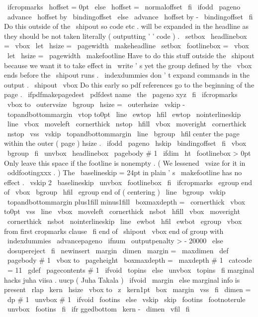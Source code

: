 {
%
\
ifcropmarks
\
hoffset
=
0pt
\
else
\
hoffset
=
\
normaloffset
\
fi
%
\
ifodd
\
pageno
\
advance
\
hoffset
by
\
bindingoffset
\
else
\
advance
\
hoffset
by
-
\
bindingoffset
\
fi
%
%
Do
this
outside
of
the
\
shipout
so
code
etc
.
will
be
expanded
in
%
the
headline
as
they
should
be
not
taken
literally
(
outputting
'
'
code
)
.
\
setbox
\
headlinebox
=
\
vbox
{
\
let
\
hsize
=
\
pagewidth
\
makeheadline
}
%
\
setbox
\
footlinebox
=
\
vbox
{
\
let
\
hsize
=
\
pagewidth
\
makefootline
}
%
%
{
%
%
Have
to
do
this
stuff
outside
the
\
shipout
because
we
want
it
to
%
take
effect
in
\
write
'
s
yet
the
group
defined
by
the
\
vbox
ends
%
before
the
\
shipout
runs
.
%
\
indexdummies
%
don
'
t
expand
commands
in
the
output
.
\
shipout
\
vbox
{
%
%
Do
this
early
so
pdf
references
go
to
the
beginning
of
the
page
.
\
ifpdfmakepagedest
\
pdfdest
name
{
\
the
\
pageno
}
xyz
\
fi
%
\
ifcropmarks
\
vbox
to
\
outervsize
\
bgroup
\
hsize
=
\
outerhsize
\
vskip
-
\
topandbottommargin
\
vtop
to0pt
{
%
\
line
{
\
ewtop
\
hfil
\
ewtop
}
%
\
nointerlineskip
\
line
{
%
\
vbox
{
\
moveleft
\
cornerthick
\
nstop
}
%
\
hfill
\
vbox
{
\
moveright
\
cornerthick
\
nstop
}
%
}
%
\
vss
}
%
\
vskip
\
topandbottommargin
\
line
\
bgroup
\
hfil
%
center
the
page
within
the
outer
(
page
)
hsize
.
\
ifodd
\
pageno
\
hskip
\
bindingoffset
\
fi
\
vbox
\
bgroup
\
fi
%
\
unvbox
\
headlinebox
\
pagebody
{
#
1
}
%
\
ifdim
\
ht
\
footlinebox
>
0pt
%
Only
leave
this
space
if
the
footline
is
nonempty
.
%
(
We
lessened
\
vsize
for
it
in
\
oddfootingxxx
.
)
%
The
\
baselineskip
=
24pt
in
plain
'
s
\
makefootline
has
no
effect
.
\
vskip
2
\
baselineskip
\
unvbox
\
footlinebox
\
fi
%
\
ifcropmarks
\
egroup
%
end
of
\
vbox
\
bgroup
\
hfil
\
egroup
%
end
of
(
centering
)
\
line
\
bgroup
\
vskip
\
topandbottommargin
plus1fill
minus1fill
\
boxmaxdepth
=
\
cornerthick
\
vbox
to0pt
{
\
vss
\
line
{
%
\
vbox
{
\
moveleft
\
cornerthick
\
nsbot
}
%
\
hfill
\
vbox
{
\
moveright
\
cornerthick
\
nsbot
}
%
}
%
\
nointerlineskip
\
line
{
\
ewbot
\
hfil
\
ewbot
}
%
}
%
\
egroup
%
\
vbox
from
first
cropmarks
clause
\
fi
}
%
end
of
\
shipout
\
vbox
}
%
end
of
group
with
\
indexdummies
\
advancepageno
\
ifnum
\
outputpenalty
>
-
20000
\
else
\
dosupereject
\
fi
}
\
newinsert
\
margin
\
dimen
\
margin
=
\
maxdimen
\
def
\
pagebody
#
1
{
\
vbox
to
\
pageheight
{
\
boxmaxdepth
=
\
maxdepth
#
1
}
}
{
\
catcode
\
=
11
\
gdef
\
pagecontents
#
1
{
\
ifvoid
\
topins
\
else
\
unvbox
\
topins
\
fi
%
marginal
hacks
juha
viisa
.
uucp
(
Juha
Takala
)
\
ifvoid
\
margin
\
else
%
marginal
info
is
present
\
rlap
{
\
kern
\
hsize
\
vbox
to
\
z
{
\
kern1pt
\
box
\
margin
\
vss
}
}
\
fi
\
dimen
=
\
dp
#
1
\
unvbox
#
1
\
ifvoid
\
footins
\
else
\
vskip
\
skip
\
footins
\
footnoterule
\
unvbox
\
footins
\
fi
\
ifr
ggedbottom
\
kern
-
\
dimen
\
vfil
\
fi
}
}
